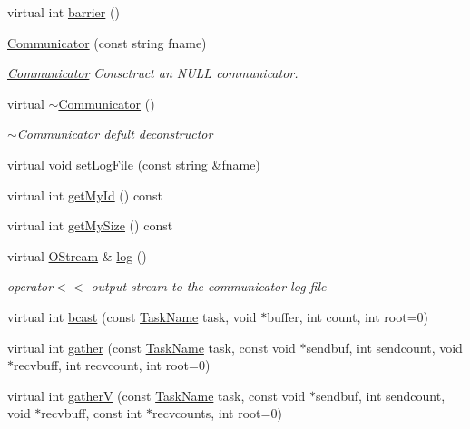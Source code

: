 \begin{DoxyCompactItemize}
\item 
virtual int \hyperlink{classHSF_1_1Communicator_a268366a86ccbb00d630b9b660a02b7c2}{barrier} ()
\item 
\hyperlink{classHSF_1_1Communicator_a3d860a8bbf699d64805747144fc4e53b}{Communicator} (const string fname)
\begin{DoxyCompactList}\small\item\em \hyperlink{classHSF_1_1Communicator}{Communicator} Consctruct an NULL communicator. \item\end{DoxyCompactList}\item 
virtual \hyperlink{classHSF_1_1Communicator_a3cd6eb9e85605b89e7763246aac70bb0}{$\sim$Communicator} ()
\begin{DoxyCompactList}\small\item\em $\sim$Communicator defult deconstructor \item\end{DoxyCompactList}\item 
virtual void \hyperlink{classHSF_1_1Communicator_a0c67eacadd200a1f385bf1487561d05d}{setLogFile} (const string \&fname)
\item 
virtual int \hyperlink{classHSF_1_1Communicator_a49da303dc707182ac09c2021a7b36619}{getMyId} () const 
\item 
virtual int \hyperlink{classHSF_1_1Communicator_a064ce6664bdb8aaff6ddd1db54bd10ab}{getMySize} () const 
\item 
virtual \hyperlink{classHSF_1_1OStream}{OStream} \& \hyperlink{classHSF_1_1Communicator_a80806fd26dfa925ef6fb55cee2cb74f5}{log} ()
\begin{DoxyCompactList}\small\item\em operator$<$$<$ output stream to the communicator log file \item\end{DoxyCompactList}\item 
virtual int \hyperlink{classHSF_1_1Communicator_aff3c788234ad6dfa837be18776f84690}{bcast} (const \hyperlink{namespaceHSF_a928eb958edfcd09f62de19e9cd3bac70}{TaskName} task, void $\ast$buffer, int count, int root=0)
\item 
virtual int \hyperlink{classHSF_1_1Communicator_ae4b80c741ad3afd2d0a7ec72c6f16624}{gather} (const \hyperlink{namespaceHSF_a928eb958edfcd09f62de19e9cd3bac70}{TaskName} task, const void $\ast$sendbuf, int sendcount, void $\ast$recvbuff, int recvcount, int root=0)
\item 
virtual int \hyperlink{classHSF_1_1Communicator_a8cd4f1f50d2c24fd0b3bc1bf3a30b8e0}{gatherV} (const \hyperlink{namespaceHSF_a928eb958edfcd09f62de19e9cd3bac70}{TaskName} task, const void $\ast$sendbuf, int sendcount, void $\ast$recvbuff, const int $\ast$recvcounts, int root=0)

\end{DoxyCompactItemize}
